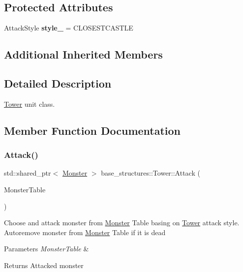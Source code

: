\subsection*{Protected Attributes}
\begin{DoxyCompactItemize}
\item 
\mbox{\label{classbase__structures_1_1Tower_a8c7b1597313e16804611c1be84761849}} 
Attack\+Style {\bfseries style\+\_\+} = C\+L\+O\+S\+E\+S\+T\+C\+A\+S\+T\+LE
\end{DoxyCompactItemize}
\subsection*{Additional Inherited Members}


\subsection{Detailed Description}
\hyperlink{classbase__structures_1_1Tower}{Tower} unit class. 

\subsection{Member Function Documentation}
\mbox{\label{classbase__structures_1_1Tower_a59b5bb7e3782ea27f53a89866dceabde}} 
\subsubsection{\texorpdfstring{Attack()}{Attack()}}
{\footnotesize\ttfamily std\+::shared\+\_\+ptr$<$ \hyperlink{classbase__structures_1_1Monster}{Monster} $>$ base\+\_\+structures\+::\+Tower\+::\+Attack (\begin{DoxyParamCaption}\item[{Monster\+Table\+\_\+ \&}]{Monster\+Table }\end{DoxyParamCaption})\hspace{0.3cm}{\ttfamily [virtual]}}

Choose and attack monster from \hyperlink{classbase__structures_1_1Monster}{Monster} Table basing on \hyperlink{classbase__structures_1_1Tower}{Tower} attack style. Autoremove monster from \hyperlink{classbase__structures_1_1Monster}{Monster} Table if it is dead 
\begin{DoxyParams}{Parameters}
{\em Monster\+Table} & \\
\hline
\end{DoxyParams}
\begin{DoxyReturn}{Returns}
Attacked monster 
\end{DoxyReturn}


